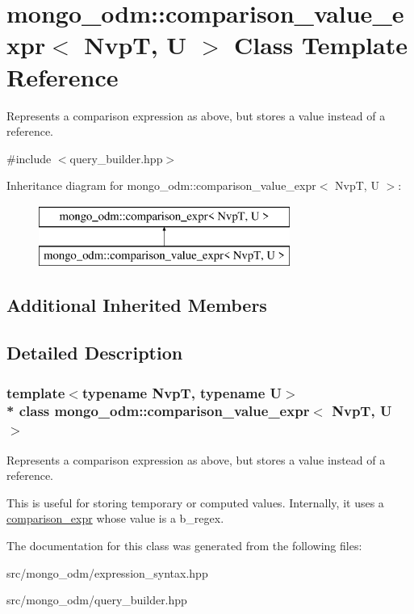 \hypertarget{classmongo__odm_1_1comparison__value__expr}{}\section{mongo\+\_\+odm\+:\+:comparison\+\_\+value\+\_\+expr$<$ NvpT, U $>$ Class Template Reference}
\label{classmongo__odm_1_1comparison__value__expr}


Represents a comparison expression as above, but stores a value instead of a reference.  




{\ttfamily \#include $<$query\+\_\+builder.\+hpp$>$}

Inheritance diagram for mongo\+\_\+odm\+:\+:comparison\+\_\+value\+\_\+expr$<$ NvpT, U $>$\+:\begin{figure}[H]
\begin{center}
\leavevmode
\includegraphics[height=2.000000cm]{classmongo__odm_1_1comparison__value__expr}
\end{center}
\end{figure}
\subsection*{Additional Inherited Members}


\subsection{Detailed Description}
\subsubsection*{template$<$typename NvpT, typename U$>$\\*
class mongo\+\_\+odm\+::comparison\+\_\+value\+\_\+expr$<$ Nvp\+T, U $>$}

Represents a comparison expression as above, but stores a value instead of a reference. 

This is useful for storing temporary or computed values. Internally, it uses a \hyperlink{classmongo__odm_1_1comparison__expr}{comparison\+\_\+expr} whose value is a b\+\_\+regex. 

The documentation for this class was generated from the following files\+:\begin{DoxyCompactItemize}
\item 
src/mongo\+\_\+odm/expression\+\_\+syntax.\+hpp\item 
src/mongo\+\_\+odm/query\+\_\+builder.\+hpp\end{DoxyCompactItemize}
